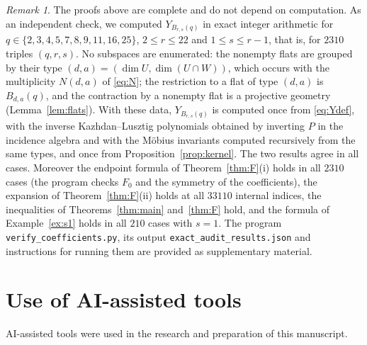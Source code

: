 \documentclass{amsart}
\theoremstyle{remark}
\newtheorem{remark}[theorem]{Remark}
\numberwithin{equation}{section}
\begin{document}
\begin{remark}
The proofs above are complete and do not depend on computation. As an independent check, we computed $Y_{B_{r,s}(q)}$ in exact integer arithmetic for $q\in\{2,3,4,5,7,8,9,11,16,25\}$, $2\le r\le22$ and $1\le s\le r-1$, that is, for $2310$ triples $(q,r,s)$. No subspaces are enumerated: the nonempty flats are grouped by their type $(d,a)=(\dim U,\dim(U\cap W))$, which occurs with the multiplicity $N(d,a)$ of \eqref{eq:N}; the restriction to a flat of type $(d,a)$ is $B_{d,a}(q)$, and the contraction by a nonempty flat is a projective geometry (Lemma~\ref{lem:flats}). With these data, $Y_{B_{r,s}(q)}$ is computed once from \eqref{eq:Ydef}, with the inverse Kazhdan--Lusztig polynomials obtained by inverting $P$ in the incidence algebra and with the M\"obius invariants computed recursively from the same types, and once from Proposition~\ref{prop:kernel}. The two results agree in all cases. Moreover the endpoint formula of Theorem~\ref{thm:F}(i) holds in all $2310$ cases (the program checks $F_0$ and the symmetry of the coefficients), the expansion of Theorem~\ref{thm:F}(ii) holds at all $33110$ internal indices, the inequalities of Theorems~\ref{thm:main} and~\ref{thm:F} hold, and the formula of Example~\ref{ex:s1} holds in all $210$ cases with ${s=1}$. The program \texttt{verify\_coefficients.py}, its output \texttt{exact\_audit\_results.json} and instructions for running them are provided as supplementary material.
\end{remark}



\section*{Use of AI-assisted tools}
AI-assisted tools were used in the research and preparation of this manuscript.
\end{document}

